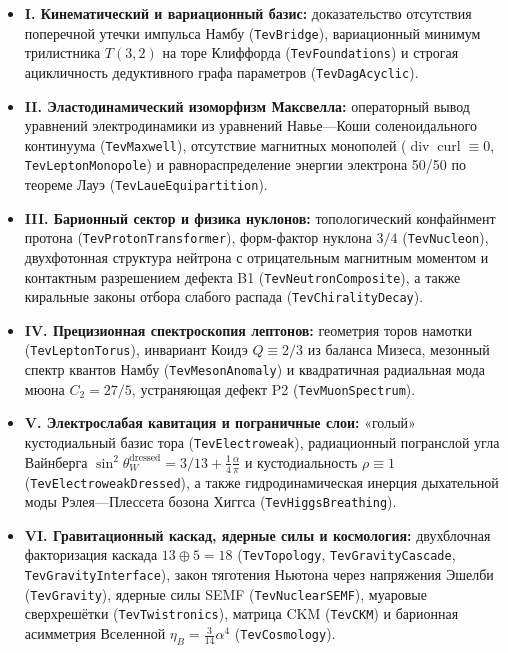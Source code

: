 \documentclass[11pt,a4paper]{article}
\theoremstyle{definition}
\theoremstyle{remark}
\begin{document}
\begin{itemize}
    \item \textbf{I. Кинематический и вариационный базис:} доказательство отсутствия поперечной утечки импульса Намбу (\texttt{TevBridge}), вариационный минимум трилистника $T(3,2)$ на торе Клиффорда (\texttt{TevFoundations}) и строгая ацикличность дедуктивного графа параметров (\texttt{TevDagAcyclic}).

    \item \textbf{II. Эластодинамический изоморфизм Максвелла:} операторный вывод уравнений электродинамики из уравнений Навье---Коши соленоидального континуума (\texttt{TevMaxwell}), отсутствие магнитных монополей ($\operatorname{div}\operatorname{curl} \equiv 0$, \texttt{TevLeptonMonopole}) и равнораспределение энергии электрона 50/50 по теореме Лауэ (\texttt{TevLaueEquipartition}).

    \item \textbf{III. Барионный сектор и физика нуклонов:} топологический конфайнмент протона (\texttt{TevProtonTransformer}), форм-фактор нуклона $3/4$ (\texttt{TevNucleon}), двухфотонная структура нейтрона с отрицательным магнитным моментом и контактным разрешением дефекта B1 (\texttt{TevNeutronComposite}), а также киральные законы отбора слабого распада (\texttt{TevChiralityDecay}).

    \item \textbf{IV. Прецизионная спектроскопия лептонов:} геометрия торов намотки (\texttt{TevLeptonTorus}), инвариант Коидэ $Q \equiv 2/3$ из баланса Мизеса, мезонный спектр квантов Намбу (\texttt{TevMesonAnomaly}) и квадратичная радиальная мода мюона $C_2 = 27/5$, устраняющая дефект P2 (\texttt{TevMuonSpectrum}).

    \item \textbf{V. Электрослабая кавитация и пограничные слои:} «голый» кустодиальный базис тора (\texttt{TevElectroweak}), радиационный погранслой угла Вайнберга $\sin^2\theta_W^{\mathrm{dressed}} = 3/13 + \frac{1}{4}\frac{\alpha}{\pi}$ и кустодиальность $\rho \equiv 1$ (\texttt{TevElectroweakDressed}), а также гидродинамическая инерция дыхательной моды Рэлея---Плессета бозона Хиггса (\texttt{TevHiggsBreathing}).

    \item \textbf{VI. Гравитационный каскад, ядерные силы и космология:} двухблочная факторизация каскада $13 \oplus 5 = 18$ (\texttt{TevTopology}, \texttt{TevGravityCascade}, \texttt{TevGravityInterface}), закон тяготения Ньютона через напряжения Эшелби (\texttt{TevGravity}), ядерные силы SEMF (\texttt{TevNuclearSEMF}), муаровые сверхрешётки (\texttt{TevTwistronics}), матрица CKM (\texttt{TevCKM}) и барионная асимметрия Вселенной $\eta_B = \frac{3}{14}\alpha^4$ (\texttt{TevCosmology}).
\end{itemize}
\end{document}
